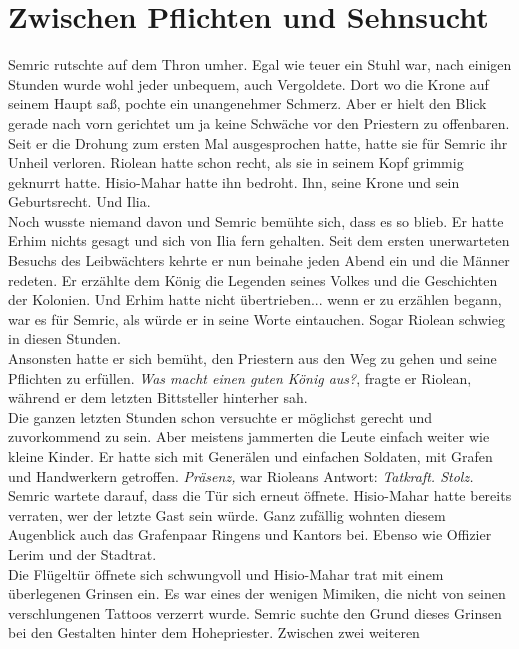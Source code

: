 \chapter{Zwischen Pflichten und Sehnsucht}

Semric rutschte auf dem Thron umher. Egal wie teuer ein Stuhl war, nach einigen Stunden wurde wohl 
jeder unbequem, auch Vergoldete. Dort wo die Krone auf seinem Haupt saß, pochte ein unangenehmer 
Schmerz. Aber er hielt den Blick gerade nach vorn gerichtet um ja keine Schwäche vor den Priestern 
zu offenbaren. Seit er die Drohung zum ersten Mal ausgesprochen hatte, hatte sie für Semric ihr 
Unheil verloren. Riolean hatte schon recht, als sie in seinem Kopf grimmig geknurrt hatte. 
Hisio-Mahar hatte ihn bedroht. Ihn, seine Krone und sein Geburtsrecht. Und Ilia.\\
Noch wusste niemand davon und Semric bemühte sich, dass es so blieb. Er hatte Erhim nichts gesagt 
und sich von Ilia fern gehalten. Seit dem ersten unerwarteten Besuchs des Leibwächters kehrte er nun 
beinahe jeden Abend ein und die Männer redeten. Er erzählte dem König die Legenden seines Volkes 
und die Geschichten der Kolonien. Und Erhim hatte nicht übertrieben... wenn er zu erzählen begann, 
war es für Semric, als würde er in seine Worte eintauchen. Sogar Riolean schwieg in diesen 
Stunden.\\
Ansonsten hatte er sich bemüht, den Priestern aus den Weg zu gehen und seine Pflichten zu erfüllen. 
\textit{Was macht einen guten König aus?}, fragte er Riolean, während er dem letzten Bittsteller 
hinterher sah.\\
Die ganzen letzten Stunden schon versuchte er möglichst gerecht und zuvorkommend zu sein. Aber 
meistens jammerten die Leute einfach weiter wie kleine Kinder. Er hatte sich mit Generälen und 
einfachen Soldaten, mit Grafen und Handwerkern getroffen. \textit{Präsenz,} war Rioleans Antwort: 
\textit{Tatkraft. Stolz.}\\
Semric wartete darauf, dass die Tür sich erneut öffnete. Hisio-Mahar hatte bereits verraten, wer 
der letzte Gast sein würde. Ganz zufällig wohnten diesem Augenblick auch das Grafenpaar Ringens und 
Kantors bei. Ebenso wie Offizier Lerim und der Stadtrat.\\
Die Flügeltür öffnete sich schwungvoll und Hisio-Mahar trat mit einem überlegenen Grinsen ein. Es 
war eines der wenigen Mimiken, die nicht von seinen verschlungenen Tattoos verzerrt wurde. Semric 
suchte den Grund dieses Grinsen bei den Gestalten hinter dem Hohepriester. Zwischen zwei weiteren 
